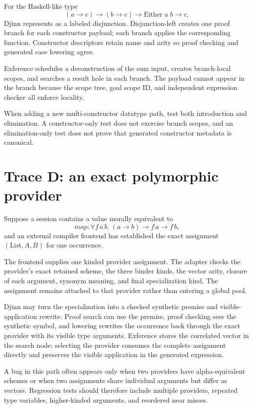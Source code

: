 \documentclass[10pt,letterpaper,oneside]{report}
\newcommand{\code}[1]{\texttt{\detokenize{#1}}}
\begin{document}
For the Haskell-like type
\[
  (a \to c) \to (b \to c) \to \mathrm{Either}\;a\;b \to c,
\]
Djinn represents \code{Either} as a labeled disjunction. Disjunction-left creates one proof branch for each constructor payload; each branch applies the corresponding function. Constructor descriptors retain name and arity so proof checking and generated case lowering agree.

Exference schedules a deconstruction of the sum input, creates branch-local scopes, and searches a result hole in each branch. The \code{a} payload cannot appear in the \code{b} branch because the scope tree, goal scope ID, and independent expression checker all enforce locality.

When adding a new multi-constructor datatype path, test both introduction and elimination. A constructor-only test does not exercise branch scopes, and an elimination-only test does not prove that generated constructor metadata is canonical.

\section{Trace D: an exact polymorphic provider}\label{sec:djex-provider-trace}

Suppose a session contains a value morally equivalent to
\[
  \mathit{map} : \forall f\,a\,b.\;(a \to b) \to f\,a \to f\,b,
\]
and an external compiler frontend has established the exact assignment \((\mathrm{List}, A, B)\) for one occurrence.

The frontend supplies one kinded provider assignment. The adapter checks the provider's exact retained scheme, the three binder kinds, the vector arity, closure of each argument, synonym meaning, and final specialization kind. The assignment remains attached to that provider rather than entering a global pool.

Djinn may turn the specialization into a checked synthetic premise and visible-application rewrite. Proof search can use the premise, proof checking sees the synthetic symbol, and lowering rewrites the occurrence back through the exact provider with its visible type arguments. Exference stores the correlated vector in the search node; selecting the provider consumes the complete assignment directly and preserves the visible application in the generated expression.

A bug in this path often appears only when two providers have alpha-equivalent schemes or when two assignments share individual arguments but differ as vectors. Regression tests should therefore include multiple providers, repeated type variables, higher-kinded arguments, and reordered near misses.
\end{document}
